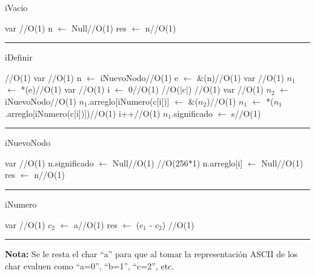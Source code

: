 \begin{algorithm}[H]
\caption{iVacio}
\begin{algorithmic}[1]
\State var \hfill //O(1)
\State n $\gets$ Null\hfill //O(1)
\State res $\gets$ n\hfill //O(1)
\EndFunction 
\end{algorithmic}
\hrule
{}
\end{algorithm}

\begin{algorithm}[H]
\caption{iDefinir}
\begin{algorithmic}[1]
\hfill //O(1)
\state var \hfill //O(1)
\state n $\gets$ iNuevoNodo\hfill //O(1)
\state e $\gets$ \&(n)\hfill //O(1)
\EndIf
\State var \hfill //O(1)
\State $n_1$ $\gets$ *(e)\hfill //O(1)
\state var \hfill //O(1)
\state i $\gets$ 0\hfill //O(1)
\hfill //O(|c|)
\hfill //O(1)
\State var \hfill //O(1)
\state $n_2$ $\gets$ iNuevoNodo\hfill //O(1)
\state $n_1$.arreglo[iNumero(c[i])] $\gets$ \&($n_2$)\hfill //O(1) 
\EndIf
\state $n_1$ $\gets$ *($n_1$.arreglo[iNumero(c[i])])\hfill //O(1)
\state i++\hfill //O(1)
\EndWhile
\state $n_1$.significado $\gets$ s\hfill //O(1)
\EndFunction 
\end{algorithmic}
\hrule
{}
\end{algorithm}


\begin{algorithm}[H]
\caption{iNuevoNodo}
\begin{algorithmic}[1]
\State var \hfill //O(1)
\State n.significado $\gets$ Null\hfill //O(1)
\hfill //O(256*1)
\State n.arreglo[i] $\gets$ Null\hfill //O(1)
\EndFor
\State res $\gets$ n\hfill //O(1)
\EndFunction 
\end{algorithmic}
\hrule
{}
\end{algorithm}


\begin{algorithm}[H]
\caption{iNumero}
\begin{algorithmic}[1]
\state var \hfill //O(1)
\state $c_2$ $\gets$ a\hfill //O(1)
\State res $\gets$ ($c_1$ - $c_2$)  \hfill //O(1)
\EndFunction 
\end{algorithmic}
\hrule
{}
\par \textbf{Nota:} Se le resta el char ``a'' para que al tomar la representación ASCII de los char evaluen como ``a=0'', ``b=1'', ``c=2'', etc. 
\end{algorithm}


